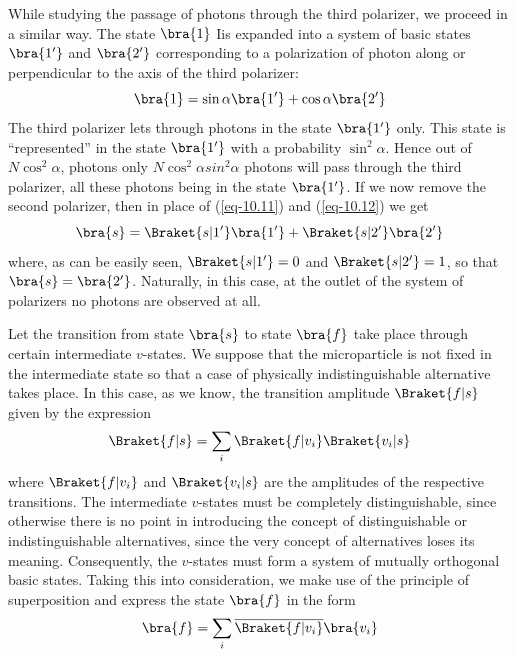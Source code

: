 \documentclass[a4paper,sfsidenotes,colorlinks=true]{tufte-book}
\numberwithin{equation}{section}
\numberwithin{figure}{section}
\begin{document}
While studying the passage of photons through the third polarizer, we
proceed in a similar way. The state $\bra{1}$ Iis expanded into a system of
basic states $\bra{1'}$ and $\bra{2'}$ corresponding to a polarization of photon
along or perpendicular to the axis of the third polarizer: 
\begin{equation}
\bra{1} = \sin \alpha \bra{1'} + \cos \alpha \bra{2'}
\label{eq-10.12} 
\end{equation}
The third polarizer lets through photons in the state $\bra{1'}$
only. This state is ``represented'' in the state $\bra{1'}$ with a
probability $\sin^{2} \alpha$. Hence out of $N \cos^{2} \alpha$,
photons only $N \cos^{2} \alpha sin^{2} \alpha$ photons will pass
through the third polarizer, all these photons being in the state
$\bra{1'}$. If we now remove the second polarizer, then in place of
(\ref{eq-10.11}) and (\ref{eq-10.12}) we get
\begin{equation}%
  \bra{s} = \Braket{s|1'} \bra{1'} + \Braket{s|2'} \bra{2'}
\label{eq-10.13} 
\end{equation}
where, as can be easily seen, $\Braket{s|1'} = 0$ and $\Braket{s|2'}
=1 $, so that $\bra{s} = \bra{2'}$. Naturally, in this case, at the
outlet of the system of polarizers no photons are observed at all.

Let the transition from state $\bra{s}$ to
state $\bra{f}$ take place through certain intermediate $v$-states. We
suppose that the microparticle is not fixed in the intermediate state
so that a case of physically indistinguishable alternative takes
place. In this case, as we know, the transition amplitude
$\Braket{f|s}$ given by the expression
\begin{equation}%
\Braket{f|s} = \sum_{i} \Braket{f|v_{i}}\Braket{v_{i}|s} 
\label{eq-10.14} 
\end{equation}
where $\Braket{f|v_{i}}$ and $\Braket{v_{i}|s}$ are the amplitudes of the respective
transitions. The intermediate $v$-states must be completely
distinguishable, since otherwise there is no point in introducing the
concept of distinguishable or indistinguishable alternatives, since
the very concept of alternatives loses its meaning. Consequently, the
$v$-states must form a system of mutually orthogonal basic
states. Taking this into consideration, we make use of the principle
of superposition and express the state $\bra{f}$ in the form
\begin{equation}%
\bra{f} = \sum_{i} \overline{\Braket{f|v_{i}}}\bra{v_{i}}
\label{eq-10.15}
\end{equation}
      
\end{document}
